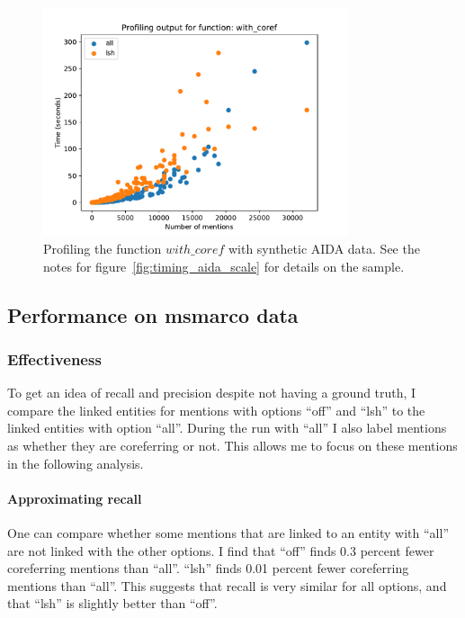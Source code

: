 \documentclass[a4paper,11pt]{article}
\numberwithin{equation}{section} %
\begin{document}
\begin{figure}[H]
  \centering
  \includegraphics[width = 0.8\textwidth]{../figs/profile_aida_scale.pdf}
  \caption{Profiling the function $with\_coref$ with synthetic AIDA data. See the notes for figure~\ref{fig:timing_aida_scale} for details on the sample.}
  \label{fig:profile_aida_scale}
\end{figure}



\subsection{Performance on msmarco data}

\subsubsection{Effectiveness}

To get an idea of recall and precision despite not having a ground truth, I compare the linked entities for mentions with options ``off'' and ``lsh'' to the linked entities with option ``all''. 
During the run with ``all'' I also label mentions as whether they are coreferring or not. This allows me to focus on these mentions in the following analysis.


\paragraph{Approximating recall}
One can compare whether some mentions that are linked to an entity with ``all'' are not linked with the other options. 
I find that ``off'' finds 0.3 percent fewer coreferring mentions than ``all''. ``lsh'' finds 0.01 percent fewer coreferring mentions than ``all''.
This suggests that recall is very similar for all options, and that ``lsh'' is slightly better than ``off''. 
\end{document}
